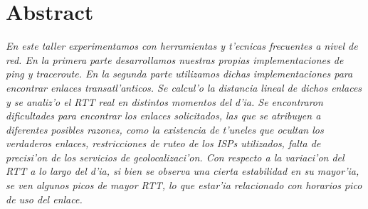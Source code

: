 \section*{\centering Abstract}

{\em
En este taller experimentamos con herramientas y t'ecnicas frecuentes a nivel de red. En la primera parte desarrollamos nuestras propias implementaciones de ping y traceroute.
En la segunda parte utilizamos dichas implementaciones para encontrar enlaces transatl'anticos. Se calcul'o la distancia lineal de dichos enlaces
y se analiz'o el RTT real en distintos momentos del d'ia. Se encontraron dificultades para encontrar los enlaces solicitados, las que se atribuyen a diferentes posibles razones, 
como la existencia de t'uneles que ocultan los verdaderos enlaces, restricciones de ruteo de los ISPs utilizados, falta de precisi'on de los
servicios de geolocalizaci'on. Con respecto a la variaci'on del RTT a lo largo del d'ia, si bien se observa una cierta estabilidad en su mayor'ia, 
se ven algunos picos de mayor RTT, lo que estar'ia relacionado con horarios pico de uso del enlace.
}

